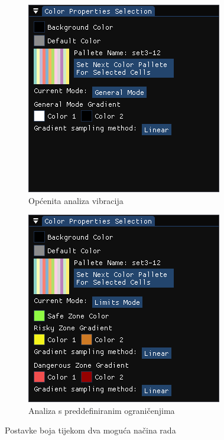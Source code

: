 \documentclass[times, utf8, diplomski]{fer}
\begin{document}
\begin{figure} [H]
     \centering
     \begin{subfigure}[h]{0.49\textwidth}
         \centering
         \includegraphics[width=\textwidth]{color_settings_normal_mode.png}
         \caption{Općenita analiza vibracija}
         \label{fig:color-settings-normal-mode}
     \end{subfigure}
     \hfill
     \begin{subfigure}[h]{0.49\textwidth}
         \centering
         \includegraphics[width=\textwidth]{color_settings_limits_mode.png}
         \caption{Analiza s preddefiniranim ograničenjima}
         \label{fig:color-settings-limits-mode}
     \end{subfigure}
     \caption{Postavke boja tijekom dva moguća načina rada}
     \label{fig:color-settings-2-modes}
\end{figure}
\end{document}
